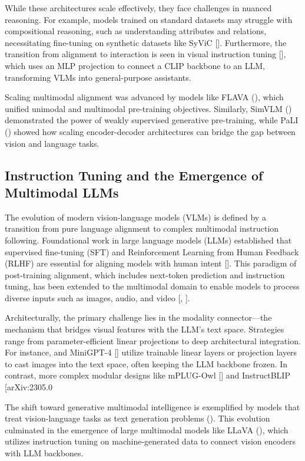 \documentclass[11pt]{article}
\begin{document}
While these architectures scale effectively, they face challenges in nuanced reasoning. For example, models trained on standard datasets may struggle with compositional reasoning, such as understanding attributes and relations, necessitating fine-tuning on synthetic datasets like SyViC [\citep{2303.17590}]. Furthermore, the transition from alignment to interaction is seen in visual instruction tuning [\citep{2310.03744}], which uses an MLP projection to connect a CLIP backbone to an LLM, transforming VLMs into general-purpose assistants.

Scaling multimodal alignment was advanced by models like FLAVA (\citep{2112.04482}), which unified unimodal and multimodal pre-training objectives. Similarly, SimVLM (\citep{2108.10904}) demonstrated the power of weakly supervised generative pre-training, while PaLI (\citep{2209.06794}) showed how scaling encoder-decoder architectures can bridge the gap between vision and language tasks.
\subsection{Instruction Tuning and the Emergence of Multimodal LLMs}

The evolution of modern vision-language models (VLMs) is defined by a transition from pure language alignment to complex multimodal instruction following. Foundational work in large language models (LLMs) established that supervised fine-tuning (SFT) and Reinforcement Learning from Human Feedback (RLHF) are essential for aligning models with human intent [\citep{2203.02155}]. This paradigm of post-training alignment, which includes next-token prediction and instruction tuning, has been extended to the multimodal domain to enable models to process diverse inputs such as images, audio, and video [\citep{2303.08774}, \citep{2312.11805}].

Architecturally, the primary challenge lies in the modality connector—the mechanism that bridges visual features with the LLM's text space. Strategies range from parameter-efficient linear projections to deep architectural integration. For instance, \citep{2301.13823} and MiniGPT-4 [\citep{2304.10592}] utilize trainable linear layers or projection layers to cast images into the text space, often keeping the LLM backbone frozen. In contrast, more complex modular designs like mPLUG-Owl [\citep{2304.14178}] and InstructBLIP [arXiv:2305.0

The shift toward generative multimodal intelligence is exemplified by models that treat vision-language tasks as text generation problems (\citep{2102.02779}). This evolution culminated in the emergence of large multimodal models like LLaVA (\citep{2304.08485}), which utilizes instruction tuning on machine-generated data to connect vision encoders with LLM backbones.
\end{document}
